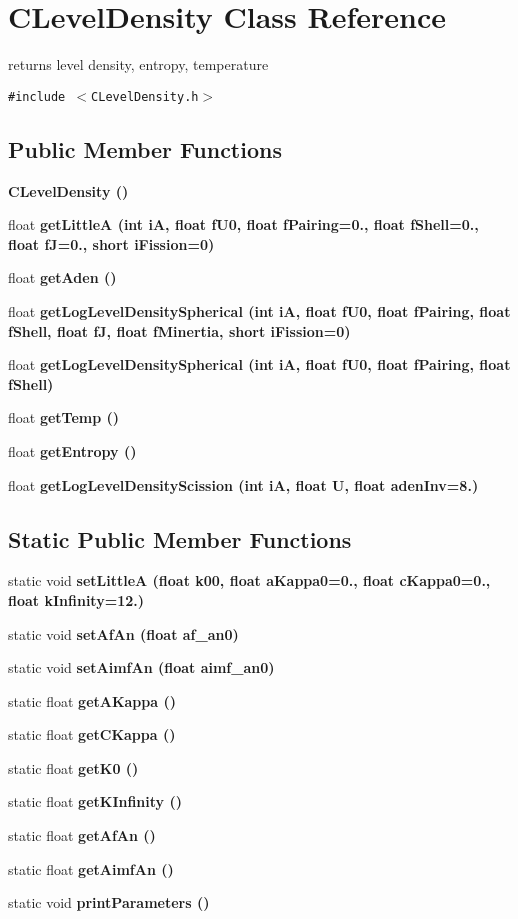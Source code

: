 \section{CLevel\-Density Class Reference}
\label{classCLevelDensity}
returns level density, entropy, temperature  


{\tt \#include $<$CLevel\-Density.h$>$}

\subsection*{Public Member Functions}
\begin{CompactItemize}
\item 
\bf{CLevel\-Density} ()
\item 
float \bf{get\-Little\-A} (int i\-A, float f\-U0, float f\-Pairing=0., float f\-Shell=0., float f\-J=0., short i\-Fission=0)
\item 
float \bf{get\-Aden} ()
\item 
float \bf{get\-Log\-Level\-Density\-Spherical} (int i\-A, float f\-U0, float f\-Pairing, float f\-Shell, float f\-J, float f\-Minertia, short i\-Fission=0)
\item 
float \bf{get\-Log\-Level\-Density\-Spherical} (int i\-A, float f\-U0, float f\-Pairing, float f\-Shell)
\item 
float \bf{get\-Temp} ()
\item 
float \bf{get\-Entropy} ()
\item 
float \bf{get\-Log\-Level\-Density\-Scission} (int i\-A, float U, float aden\-Inv=8.)
\end{CompactItemize}
\subsection*{Static Public Member Functions}
\begin{CompactItemize}
\item 
static void \bf{set\-Little\-A} (float k00, float a\-Kappa0=0., float c\-Kappa0=0., float \bf{k\-Infinity}=12.)
\item 
static void \bf{set\-Af\-An} (float af\_\-an0)
\item 
static void \bf{set\-Aimf\-An} (float aimf\_\-an0)
\item 
static float \bf{get\-AKappa} ()
\item 
static float \bf{get\-CKappa} ()
\item 
static float \bf{get\-K0} ()
\item 
static float \bf{get\-KInfinity} ()
\item 
static float \bf{get\-Af\-An} ()
\item 
static float \bf{get\-Aimf\-An} ()
\item 
static void \bf{print\-Parameters} ()
\end{CompactItemize}
